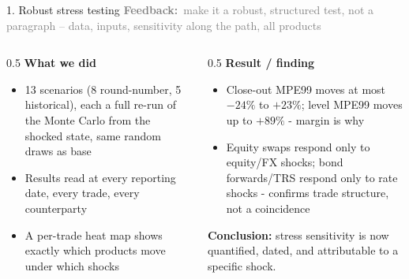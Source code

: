 \documentclass[9pt,aspectratio=169]{beamer}
\newcommand{\feedbacktag}[1]{{\small\textcolor{grey}{\textbf{Feedback:}~#1}}}
\begin{document}
\begin{frame}{1. Robust stress testing}
  \feedbacktag{make it a robust, structured test, not a paragraph -- data, inputs, sensitivity along the path, all products}
  \vspace{6pt}
  \begin{columns}[T]
    \begin{column}{0.5\textwidth}
      \textbf{What we did}
      \begin{itemize}
        \item 13 scenarios (8 round-number, 5 historical), each a full re-run of the Monte Carlo from the shocked state, same random draws as base
        \item Results read at every reporting date, every trade, every counterparty
        \item A per-trade heat map shows exactly which products move under which shocks
      \end{itemize}
    \end{column}
    \begin{column}{0.5\textwidth}
      \textbf{Result / finding}
      \begin{itemize}
        \item Close-out MPE99 moves at most $-24\%$ to $+23\%$; level MPE99 moves up to $+89\%$ - margin is why
        \item Equity swaps respond only to equity/FX shocks; bond forwards/TRS respond only to rate shocks - confirms trade structure, not a coincidence
      \end{itemize}
      \vspace{6pt}
      \textbf{Conclusion:} stress sensitivity is now quantified, dated, and attributable to a specific shock.
    \end{column}
  \end{columns}
\end{frame}
\end{document}
